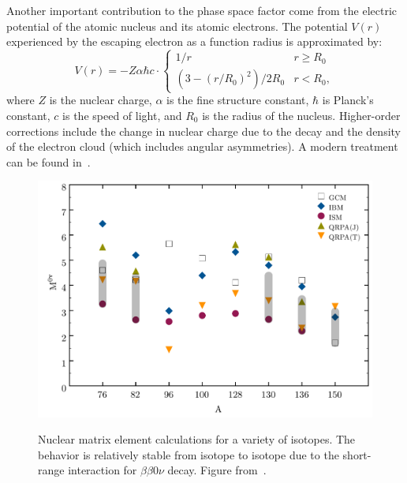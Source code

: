 Another important contribution to the phase space factor come from the electric potential of the atomic nucleus and its atomic electrons.  The potential $V(r)$ experienced by the escaping electron as a function radius is approximated by:~\cite{PhysRevC.87.014315}
\begin{equation}
V(r) = -Z \alpha \hbar c \cdot \begin{cases}
1/r & r \ge R_0 \\
\left(3-(r/R_0)^2\right)/2R_0 & r < R_0,
\end{cases}
\end{equation}
where $Z$ is the nuclear charge, $\alpha$ is the fine structure constant, $\hbar$ is Planck's constant, $c$ is the speed of light, and $R_0$ is the radius of the nucleus.  Higher-order corrections include the change in nuclear charge due to the decay and the density of the electron cloud (which includes angular asymmetries).  A modern treatment can be found in~\cite{PhysRevC.87.014315}.

\begin{figure}
\begin{center}
\includegraphics[keepaspectratio=true,width=\textwidth]{SenseAndSensitivityNME.pdf}
\end{center}
\renewcommand{\baselinestretch}{1}
\small\normalsize
\begin{quote}
\caption{Nuclear matrix element calculations for a variety of isotopes.  The behavior is relatively stable from isotope to isotope due to the short-range interaction for $\beta\beta 0\nu$ decay.  Figure from~\cite{1475-7516-2011-06-007}.}
\label{fig:MatrixElementComparisonVsAtom}
\end{quote}
\end{figure}
\renewcommand{\baselinestretch}{2}
\small\normalsize

